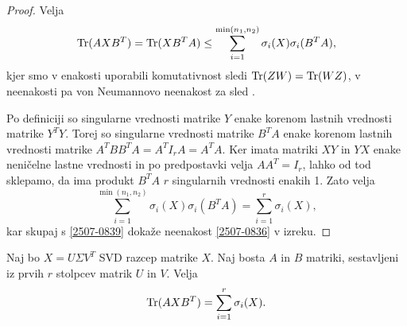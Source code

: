 \begin{proof}
    Velja
    \begin{align}
        \label{2507-0839}
        \operatorname{Tr}(AXB^T) = \operatorname{Tr}(XB^TA) \leq \sum^{\min(n_1, n_2)}_{i=1} \sigma_i(X) \sigma_i(B^TA),
    \end{align}
    kjer smo v enakosti uporabili komutativnost sledi $\operatorname{Tr}(ZW)=\operatorname{Tr}(WZ)$,
    v neenakosti pa von Neumannovo neenakost za sled \cite{TNNM-HZYLH12}.

    Po definiciji so singularne vrednosti matrike $Y$ enake korenom lastnih vrednosti matrike $Y^TY$. Torej so singularne vrednosti matrike $B^TA$ enake korenom lastnih vrednosti matrike $A^TBB^TA=A^TI_rA = A^TA$.
    Ker imata matriki $XY$ in $YX$ enake neničelne lastne vrednosti in po predpostavki velja $AA^T = I_r$, lahko
    od tod sklepamo, da ima produkt $B^TA$ $r$ singularnih vrednosti enakih 1.
    Zato velja
    \[
        \sum^{\min(n_1, n_2)}_{i=1} \sigma_i(X) \sigma_i(B^TA) = \sum^{r}_{i=1} \sigma_i(X),
    \]
    kar skupaj s \eqref{2507-0839}
    dokaže neenakost \eqref{2507-0836}
    v izreku.
\end{proof}

\begin{theorem}
    \label{2507-0851}
    Naj bo $X = U \Sigma V^T$
    SVD razcep matrike $X$.
    Naj bosta $A$ in $B$ matriki, sestavljeni
    iz prvih $r$ stolpcev matrik $U$ in $V$.
    Velja
    \[\operatorname{Tr}(AXB^T) = \sum^{r}_{i=1} \sigma_i(X).\]
\end{theorem}

